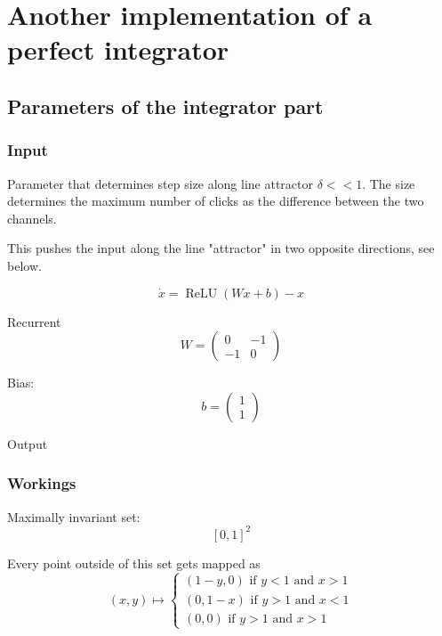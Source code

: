 \documentclass{article}
\DeclareMathOperator{\relu}{ReLU}
\theoremstyle{definition}
\theoremstyle{remark}
\begin{document}
\section{Another implementation of a perfect integrator}

\subsection{Parameters of the integrator part}
\subsubsection{Input}
Parameter that determines step size along line attractor $\delta<<1$.
The size determines the maximum number of clicks as the difference between the two channels. 

This pushes the input along the line "attractor" in two opposite directions, %
see below.

\begin{equation}\label{eq:bla}
\dot x = \relu(Wx+b) -x
\end{equation}

Recurrent
\begin{equation}
W = 
\begin{pmatrix}
0  &  -1 \\
-1  &  0
\end{pmatrix}
\end{equation}

Bias:
\begin{equation}
b = 
\begin{pmatrix}
1 \\  1 
\end{pmatrix}
\end{equation}

Output


\subsubsection{Workings}
Maximally invariant set:
\[ [0,1]^2\]

Every point outside of this set gets mapped as
\[
(x,y) \mapsto
\begin{cases}
(1-y,0) \text{ if } y<1 \text{ and } x>1\\
(0,1-x) \text{ if } y>1 \text{ and } x<1\\
(0,0) \text{ if } y>1 \text{ and } x>1
\end{cases}
\]
\end{document}
